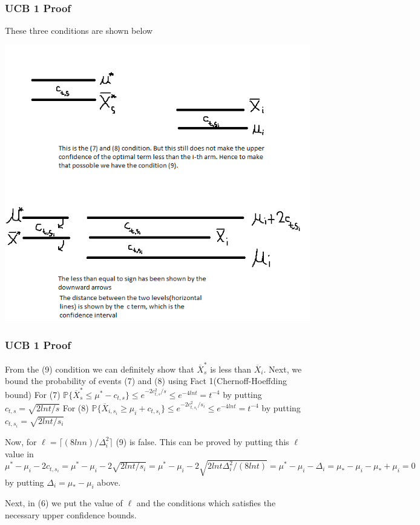 \documentclass{beamer}
\begin{document}
\begin{frame}
\frametitle{UCB 1 Proof}
These three conditions are shown below

\begin{tabbing}
\includegraphics[scale=0.3]{img/Explanation.png}
\end{tabbing}
\end{frame}


\begin{frame}
\frametitle{UCB 1 Proof}

From the (9) condition we can definitely show that $\overline{X}_{s}^{*}$ is less than $\overline{X}_{i}$.
\newline
\newline
Next, we bound the probability of events (7) and (8) using Fact 1(Chernoff-Hoeffding bound)
\newline
For (7)
$\mathbb P\lbrace\overline{X}_{s}^{*}\leq\mu^{*}-c_{t,s}\rbrace \leq e^{-2c_{t,s}^{2}/s} \leq e^{-4lnt} = t^{-4}$ by putting $c_{t,s}=\sqrt{2lnt/s}$
\newline
For (8)
$\mathbb P\lbrace\overline{X}_{i,s_{i}}\geq\mu_{i}+c_{t,s_{i}}\rbrace \leq e^{-2c_{t,s_{i}}^{2}/s_{i}} \leq e^{-4lnt} = t^{-4}$ by putting $c_{t,s_{i}}=\sqrt{2lnt/s_{i}}$
\newline

Now, for $\ell=\lceil (8ln n)/\Delta_{i}^{2}\rceil$ (9) is false. This can be proved by putting this $\ell$ value in
\newline
$\mu^{*} - \mu_{i} - 2c_{t,s_{i}}= \mu^{*} - \mu_{i} - 2\sqrt{2ln t/s_{i}}=\mu^{*} - \mu_{i} - 2\sqrt{2ln t\Delta_{i}^{2}/(8lnt)}=\mu^{*} - \mu_{i} - \Delta_{i} = \mu_{*} - \mu_{i} - \mu_{*} + \mu_{i}=0$
\newline
by putting $\Delta_{i}=\mu_{*} - \mu_{i}$ above.

Next, in (6) we put the value of $\ell$ and the conditions which satisfies the necessary upper confidence bounds.

\end{frame}
\end{document}
